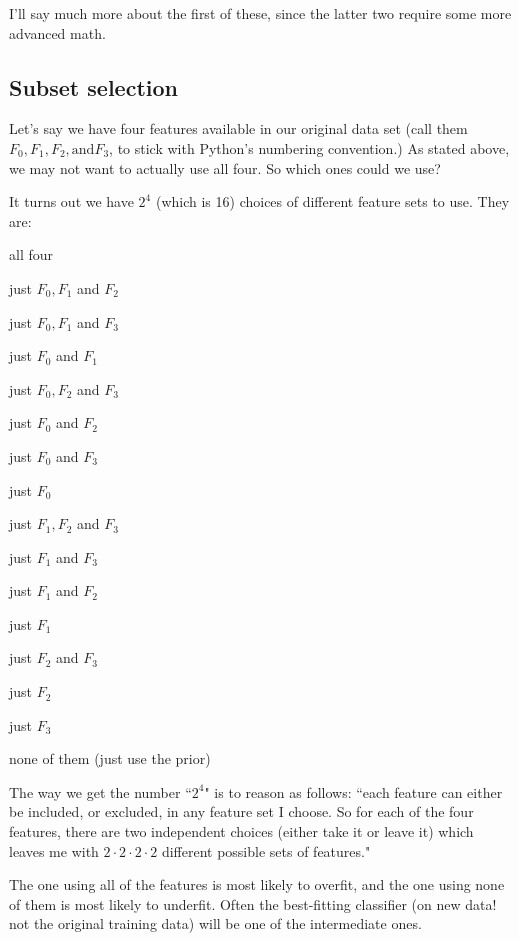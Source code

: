 \documentclass[12pt]{article}
\begin{document}
I'll say much more about the first of these, since the latter two require some
more advanced math.

\subsection{Subset selection}

Let's say we have four features available in our original data set (call them
$F_0,F_1,F_2, \textrm{and} F_3$, to stick with Python's numbering
convention.) As stated above, we may not want to actually use all four. So
which ones could we use?

It turns out we have $2^4$ (which is 16) choices of different feature sets to
use. They are:

\begin{compactitem}
\item all four
\item just $F_0,F_1$ and $F_2$
\item just $F_0,F_1$ and $F_3$
\item just $F_0$ and $F_1$
\item just $F_0,F_2$ and $F_3$
\item just $F_0$ and $F_2$
\item just $F_0$ and $F_3$
\item just $F_0$
\item just $F_1,F_2$ and $F_3$
\item just $F_1$ and $F_3$
\item just $F_1$ and $F_2$
\item just $F_1$
\item just $F_2$ and $F_3$
\item just $F_2$
\item just $F_3$
\item none of them (just use the prior)
\end{compactitem}

The way we get the number ``$2^4$" is to reason as follows: ``each feature can
either be included, or excluded, in any feature set I choose. So for each
of the four features, there are two independent choices (either take it or
leave it) which leaves me with $2 \cdot 2 \cdot 2 \cdot 2$ different possible
sets of features."

The one using all of the features is most likely to overfit, and the one using
none of them is most likely to underfit. Often the best-fitting classifier (on
new data! not the original training data) will be one of the intermediate
ones.
\end{document}
